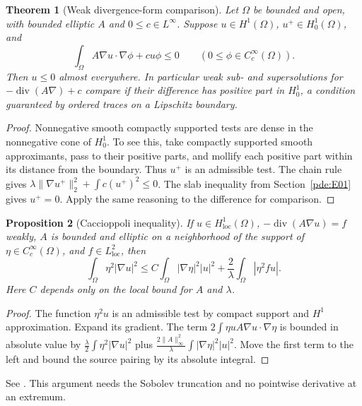 \documentclass[11pt,oneside,openany]{book}
\theoremstyle{plain}
\newtheorem{theorem}{Theorem}[chapter]
\newtheorem{proposition}[theorem]{Proposition}
\theoremstyle{definition}
\theoremstyle{remark}
\begin{document}
\begin{theorem}[Weak divergence-form comparison]\label{pde:elliptic-weak-max}
Let \(\Omega\) be bounded and open, with bounded elliptic \(A\)
and \(0\leq c\in L^\infty\). Suppose \(u\in H^1(\Omega)\),
\(u^+\in H_0^1(\Omega)\), and
\[
 \int_\Omega A\nabla u\cdot\nabla\phi+cu\phi\leq0
 \qquad(0\leq\phi\in C_c^\infty(\Omega)).
\]
Then \(u\leq0\) almost everywhere. In particular weak sub- and
supersolutions for \(-\operatorname{div}(A\nabla)+c\) compare
if their difference has positive part in \(H_0^1\), a condition
guaranteed by ordered traces on a Lipschitz boundary.
\end{theorem}

\begin{proof}
Nonnegative smooth compactly supported tests are dense in the
nonnegative cone of \(H_0^1\). To see this, take compactly
supported smooth approximants, pass to their positive parts,
and mollify each positive part within its distance from the
boundary. Thus \(u^+\) is an admissible test. The chain rule gives
\(\lambda\|\nabla u^+\|_2^2+\int c(u^+)^2\leq0\).
The slab inequality from Section~\ref{pde:E01} gives \(u^+=0\).
Apply the same reasoning to the difference for comparison.
\end{proof}

\begin{proposition}[Caccioppoli inequality]\label{pde:elliptic-caccioppoli}
If \(u\in H^1_{\mathrm{loc}}(\Omega)\),
\(-\operatorname{div}(A\nabla u)=f\) weakly,
\(A\) is bounded and elliptic on a neighborhood of the support
of \(\eta\in C_c^\infty(\Omega)\), and \(f\in L^2_{\mathrm{loc}}\),
then
\[
 \int_\Omega \eta^2|\nabla u|^2
 \leq C\int_\Omega|\nabla\eta|^2 |u|^2
     +\frac{2}{\lambda}\int_\Omega |\eta^2 f u|.
\]
Here \(C\) depends only on the local bound for \(A\) and \(\lambda\).
\end{proposition}

\begin{proof}
The function \(\eta^2u\) is an admissible test by compact support
and \(H^1\) approximation. Expand its gradient. The term
\(2\int \eta u A\nabla u\cdot\nabla\eta\) is bounded in absolute
value by \(\frac{\lambda}{2}\int \eta^2|\nabla u|^2\)
plus \(\frac{2\|A\|_\infty^2}{\lambda}
\int|\nabla\eta|^2|u|^2\). Move the first term to the left and
bound the source pairing by its absolute integral.
\end{proof}

See \cite[Sections 8.1 and 8.6]{GT}. This argument needs the
Sobolev truncation and no pointwise derivative at an extremum.
\end{document}
